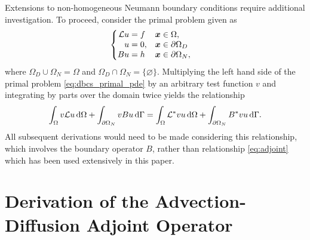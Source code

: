 Extensions to non-homogeneous Neumann boundary conditions
require additional investigation. To proceed,
consider the primal problem given as
%
\begin{gather}
\begin{cases}
\begin{aligned}
\mathcal{L} u &= f & & \boldsymbol{x} \in \Omega, \\
u &= 0, & & \boldsymbol{x} \in \partial \Omega_D \\
B u &= h & & \boldsymbol{x} \in \partial \Omega_N,
\end{aligned}
\end{cases}
\label{eq:dbcs_primal_pde}
\end{gather}
%
where $\Omega_D \cup \Omega_N = \Omega$ and $\Omega_D \cap \Omega_N =
\{ \varnothing \}$. Multiplying the left hand side of the
primal problem \eqref{eq:dbcs_primal_pde}
by an arbitrary test function $v$ and integrating by parts over the
domain twice yields the relationship
%
\begin{gather}
\int_{\Omega} v \mathcal{L} u \, \text{d} \Omega +
\int_{\partial \Omega_N} v B u \, \text{d} \Gamma =
\int_{\Omega} \mathcal{L}^* v u \, \text{d} \Omega +
\int_{\partial \Omega_N} B^* v u \, \text{d} \Gamma.
\end{gather}
%
All subsequent derivations would need to be
made considering this relationship, which involves
the boundary operator $B$, rather than
relationship \eqref{eq:adjoint} which has
been used extensively in this paper.

\section{Derivation of the Advection-Diffusion Adjoint Operator}
\label{app:adjoint}

